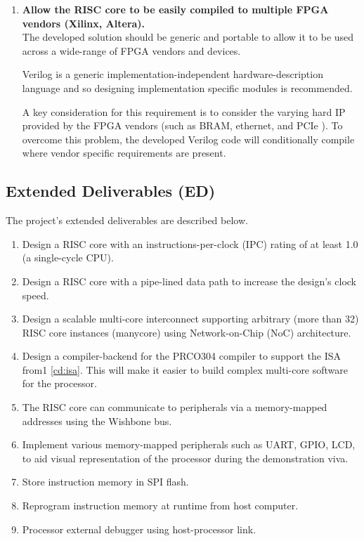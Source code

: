 \documentclass[11pt,a4paper]{report}
\begin{document}
{\begin{enumerate}[leftmargin=2\parindent, label=\bfseries CD\arabic*]
\item{\textbf{Allow the RISC core to be easily compiled to multiple FPGA vendors (Xilinx, Altera).}\\
The developed solution should be generic and portable to allow it to be used across a wide-range of FPGA vendors and devices.

Verilog is a generic implementation-independent hardware-description language and so designing implementation specific modules is recommended.

A key consideration for this requirement is to consider the varying hard IP provided by the FPGA vendors (such as BRAM, ethernet, and PCIe \cite{xilinxbram,alterabram}). To overcome this problem, the developed Verilog code will conditionally compile where vendor specific requirements are present.
}\label{cd:vendor}
\end{enumerate}

\subsection{Extended Deliverables (ED)}
The project's extended deliverables are described below.
\begin{enumerate}[leftmargin=2\parindent, label=\bfseries ED\arabic*]
    \item{Design a RISC core with an instructions-per-clock (IPC) rating of at least 1.0 (a single-cycle CPU).}
\label{ed:ipc}
    \item{Design a RISC core with a pipe-lined data path to increase the design's clock speed.}\label{ed:pipeline}
    \item{Design a scalable multi-core interconnect supporting arbitrary (more than 32) RISC core instances (manycore) using Network-on-Chip (NoC) architecture.}\label{ed:scale}
    \item{Design a compiler-backend for the PRCO304 \cite{prco304} compiler to support the ISA from1 \ref{cd:isa}. This will make it easier to build complex multi-core software for the processor.}\label{ed:compiler}
    \item{The RISC core can communicate to peripherals via a memory-mapped addresses using the Wishbone bus.}\label{ed:mmu}
    \item{Implement various memory-mapped peripherals such as UART, GPIO, LCD, to aid visual representation of the processor during the demonstration viva.}\label{ed:peripherals} 
    \item{Store instruction memory in SPI flash.}\label{ed:flash}
    \item{Reprogram instruction memory at runtime from host computer.}\label{ed:program}
    \item{Processor external debugger using host-processor link.}\label{ed:debug}
\end{enumerate}

}
\end{document}
